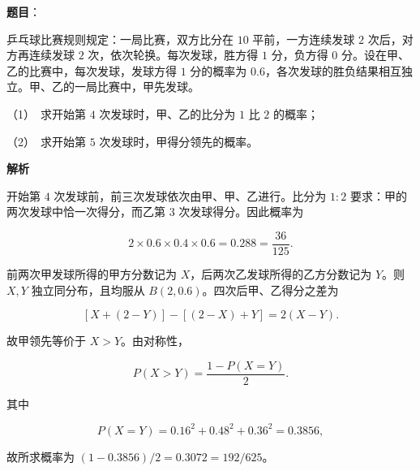 \begin{answer}

\textbf{题目}：

乒乓球比赛规则规定：一局比赛，双方比分在 $10$ 平前，一方连续发球 $2$ 次后，对方再连续发球 $2$ 次，依次轮换。每次发球，胜方得 $1$ 分，负方得 $0$ 分。设在甲、乙的比赛中，每次发球，发球方得 $1$ 分的概率为 $0.6$，各次发球的胜负结果相互独立。甲、乙的一局比赛中，甲先发球。

（1）　求开始第 $4$ 次发球时，甲、乙的比分为 $1$ 比 $2$ 的概率；

（2）　求开始第 $5$ 次发球时，甲得分领先的概率。

\textbf{解析}


开始第 $4$ 次发球前，前三次发球依次由甲、甲、乙进行。比分为 $1:2$ 要求：甲的两次发球中恰一次得分，而乙第 $3$ 次发球得分。因此概率为

\nopagebreak[4]
\[
2\times0.6\times0.4\times0.6=0.288=\frac{36}{125}.
\]


前两次甲发球所得的甲方分数记为 $X$，后两次乙发球所得的乙方分数记为 $Y$。则 $X,Y$ 独立同分布，且均服从 $B(2,0.6)$。四次后甲、乙得分之差为

\nopagebreak[4]
\[
[X+(2-Y)]-[(2-X)+Y]=2(X-Y).
\]

故甲领先等价于 $X>Y$。由对称性，

\nopagebreak[4]
\[
P(X>Y)=\frac{1-P(X=Y)}2.
\]

其中

\nopagebreak[4]
\[
P(X=Y)=0.16^2+0.48^2+0.36^2=0.3856,
\]

故所求概率为 $(1-0.3856)/2=0.3072=192/625$。



\end{answer}
